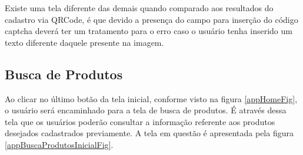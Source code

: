 \newpage
Existe uma tela diferente das demais quando comparado aos resultados do cadastro via QRCode, é que devido a presença do campo para inserção do código captcha deverá ter um tratamento para o erro caso o usuário tenha inserido um texto diferente daquele presente na imagem.

\subsection{Busca de Produtos}

Ao clicar no último botão da tela inicial, conforme visto na figura \ref{appHomeFig}, o usuário será encaminhado para a tela de busca de produtos. É através dessa tela que os usuários poderão consultar a informação referente aos produtos desejados cadastrados previamente. A tela em questão é apresentada pela figura \ref{appBuscaProdutosInicialFig}.

